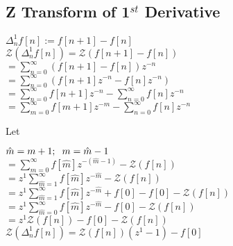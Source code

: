\documentclass[11pt]{article}
\begin{document}
\subsection{Z Transform of 1$^{st}$ Derivative}
\begin{center}
\vspace{1mm}
$
\Delta_n^1 f[n] := f[n+1] - f[n]
$
\\ \vspace{3mm}
$
\mathcal{Z}(\Delta_n^1 f[n]) = \mathcal{Z}(f[n+1] - f[n])
$
\\ \vspace{3mm}
$
= \sum_{n=0}^{\infty} (f[n+1] - f[n]) z^{-n}
$
\\ \vspace{3mm}
$
= \sum_{n=0}^{\infty} (f[n+1]z^{-n} - f[n] z^{-n})
$
\\ \vspace{3mm}
$
= \sum_{n=0}^{\infty} f[n+1]z^{-n} - \sum_{n=0}^{\infty} f[n] z^{-n}
$
\\ \vspace{3mm}
$
= \sum_{m=0}^{\infty} f[m+1]z^{-m} - \sum_{n=0}^{\infty} f[n] z^{-n}
$
\end{center}
Let 
\begin{center}
$
\hat{m} = m + 1; \hspace{2mm} m = \hat{m} - 1
$
\\ \vspace{3mm}
$
= \sum_{m=0}^{\infty} f[\hat{m}]z^{-(\hat{m}-1)} - \mathcal{Z}(f[n])
$
\\ \vspace{3mm}
$
= z^1 \sum_{\hat{m}=1}^{\infty} f[\hat{m}]z^{-\hat{m}} - \mathcal{Z}(f[n])
$
\\ \vspace{3mm}
$
= z^1 \sum_{\hat{m}=1}^{\infty} f[\hat{m}]z^{-\hat{m}} + f[0] - f[0] - \mathcal{Z}(f[n])
$
\\ \vspace{3mm}
$
= z^1 \sum_{\hat{m}=0}^{\infty} f[\hat{m}]z^{-\hat{m}} - f[0] - \mathcal{Z}(f[n])
$
\\ \vspace{3mm}
$
= z^1\mathcal{Z}(f[n]) - f[0] - \mathcal{Z}(f[n])
$
\\ \vspace{3mm}
$
\mathcal{Z}(\Delta_n^1 f[n]) = \mathcal{Z}(f[n])(z^1 - 1) - f[0]
$
\end{center}
\end{document}
